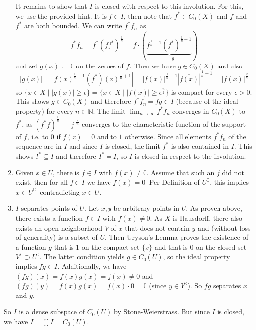 \documentclass[a4paper]{article}
\begin{document}
\begin{enumerate}
    It remains to show that $I$ is closed with respect to this involution.
    For this, we use the provided hint.
    It is $f \in I$, then note that $f^* \in C_0(X)$ and $f$ and $f^*$ are both bounded. We can write $f^* f_n$ as
    \begin{equation*}
        f^* f_n = f^* (f f^*)^{\frac{1}{n}} = f \cdot (\underbrace{f^{\frac{1}{n} - 1} (f^*)^{\frac{1}{n} + 1}}_{\coloneq g})
    \end{equation*}
    and set $g(x) := 0$ on the zeroes of $f$. Then we have $g \in C_0(X)$ and also
    \begin{equation*}
        |g(x)| = |f(x)^{\frac{1}{n} - 1} (f^*)(x)^{\frac{1}{n} + 1}| = |f(x)|^{\frac{1}{n} - 1} |\overline{f(x)}|^{\frac{1}{n} + 1} = |f(x)|^{\frac{2}{n}}
    \end{equation*}
    so $\{x \in X \mid |g(x)| \geq \epsilon\} = \{x \in X \mid |f(x)| \geq \epsilon^{\frac{n}{2}}\}$ is compact for every $\epsilon > 0$.
    This shows $g \in C_0(X)$ and therefore $f^* f_n = f g \in I$ (because of the ideal property) for every $n \in \mathds{N}$.
    The limit $\lim_{n \to \infty} f^* f_n$ converges in $C_0(X)$ to $f^*$, as $(f^* f)^{\frac{1}{n}} = |f|^{\frac{2}{n}}$ converges to the characteristic function of the support of $f$, i.e. to $0$ if $f(x) = 0$ and to $1$ otherwise.
    Since all elements $f^* f_n$ of the sequence are in $I$ and since $I$ is closed, the limit $f^*$ is also contained in $I$.
    This shows $I^* \subseteq I$ and therefore $I^* = I$, so $I$ is closed in respect to the involution.
    \item Given $x \in U$, there is $f \in I$ with $f(x) \neq 0$.
    Assume that such an $f$ did not exist, then for all $f \in I$ we have $f(x) = 0$.
    Per Definition of $U^\complement$, this implies $x \in U^\complement$, contradicting $x \in U$.
    \item $I$ separates points of $U$. Let $x,y$ be arbitrary points in $U$.
    As proven above, there exists a function $f \in I$ with $f(x) \neq 0$.
    As $X$ is Hausdorff, there also exists an open neighborhood $V$ of $x$ that does not contain $y$ and (without loss of generality) is a subset of $U$.
    Then Uryson's Lemma proves the existence of a function $g$ that is $1$ on the compact set $\{x\}$ and that is $0$ on the closed set $V^\complement \supset U^\complement$.
    The latter condition yields $g \in C_0(U)$, so the ideal property implies $fg \in I$.
    Additionally, we have $(fg)(x) = f(x) g(x) = f(x) \neq 0$ and $(fg)(y) = f(x) g(x) = f(x) \cdot 0 = 0$ (since $y \in V^\complement$). So $fg$ separates $x$ and $y$.
\end{enumerate}
So $I$ is a dense subspace of $C_0(U)$ by Stone-Weierstrass.
But since $I$ is closed, we have $I = \closure{I} = C_0(U)$.
\end{document}

